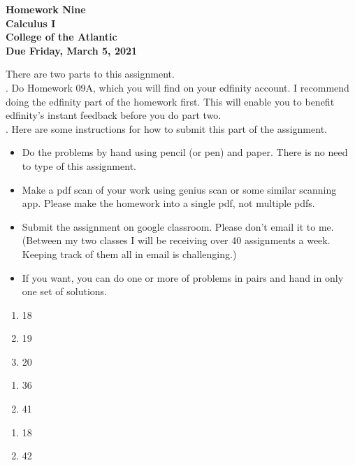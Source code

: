 \documentclass[12pt]{article}
\begin{document}
\pagestyle{empty}
 
\begin{center}
{\LARGE {\bf Homework Nine}}\\
\bigskip
{\Large {\bf Calculus I}}\\
\bigskip
{\Large {\bf College of the Atlantic}}\\
\bigskip
{ {\bf Due Friday, March 5, 2021}}\\ 
\end{center}
\medskip


\noindent There are two parts to this assignment.\\

.  Do Homework 09A, which you will
find on your edfinity account.  I 
recommend doing the edfinity part of the homework first.  This will
enable you to benefit edfinity's instant feedback before you do part
two.\\   


.  Here are some
instructions for how to submit this part of the assignment.
\begin{itemize}
\item Do the problems by hand using pencil (or pen) and paper.
  There is no need to type of this assignment.
\item Make a pdf scan of your work using genius scan or some
  similar scanning app.  Please make the homework into a single
  pdf, not multiple pdfs.
\item Submit the assignment on google classroom.  Please don't
  email it to me.  (Between my two classes I will be receiving
  over 40 assignments a week.  Keeping track of them all in email
  is challenging.)
\item If you want, you can do one or more of problems in pairs and hand 
  in only one set of solutions.\\
\end{itemize}




\begin{enumerate}
\setlength{\itemsep}{-1mm}
\item 18
\item 19
\item 20
\end{enumerate}

\begin{enumerate}
\setlength{\itemsep}{-1mm}
\item 36
\item 41
\end{enumerate}

\begin{enumerate}
\setlength{\itemsep}{-1mm}
\item 18
\item 42
\end{enumerate}
\end{document}
